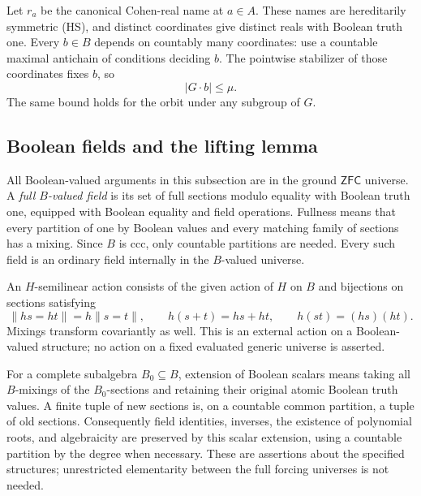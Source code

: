 \documentclass[11pt,a4paper]{article}
\theoremstyle{definition}\newtheorem{definition}[theorem]{Definition}
\theoremstyle{remark}\newtheorem{remark}[theorem]{Remark}
\begin{document}
Let $r_a$ be the canonical Cohen-real name at $a\in A$. These names are hereditarily symmetric (HS), and distinct coordinates give distinct reals with Boolean truth one. Every $b\in B$ depends on countably many coordinates: use a countable maximal antichain of conditions deciding $b$. The pointwise stabilizer of those coordinates fixes $b$, so
\begin{equation}\label{eq:boolean-small-orbit}
|G\cdot b|\leq\mu.
\end{equation}
The same bound holds for the orbit under any subgroup of $G$.

\subsection{Boolean fields and the lifting lemma}
All Boolean-valued arguments in this subsection are in the ground $\mathsf{ZFC}$ universe. A \emph{full $B$-valued field} is its set of full sections modulo equality with Boolean truth one, equipped with Boolean equality and field operations. Fullness means that every partition of one by Boolean values and every matching family of sections has a mixing. Since $B$ is ccc, only countable partitions are needed. Every such field is an ordinary field internally in the $B$-valued universe.

An $H$-semilinear action consists of the given action of $H$ on $B$ and bijections on sections satisfying
\[
\lVert hs=ht\rVert=h\lVert s=t\rVert,
\qquad h(s+t)=hs+ht,\qquad h(st)=(hs)(ht).
\]
Mixings transform covariantly as well. This is an external action on a Boolean-valued structure; no action on a fixed evaluated generic universe is asserted.

For a complete subalgebra $B_0\subseteq B$, extension of Boolean scalars means taking all $B$-mixings of the $B_0$-sections and retaining their original atomic Boolean truth values. A finite tuple of new sections is, on a countable common partition, a tuple of old sections. Consequently field identities, inverses, the existence of polynomial roots, and algebraicity are preserved by this scalar extension, using a countable partition by the degree when necessary. These are assertions about the specified structures; unrestricted elementarity between the full forcing universes is not needed.
\end{document}
